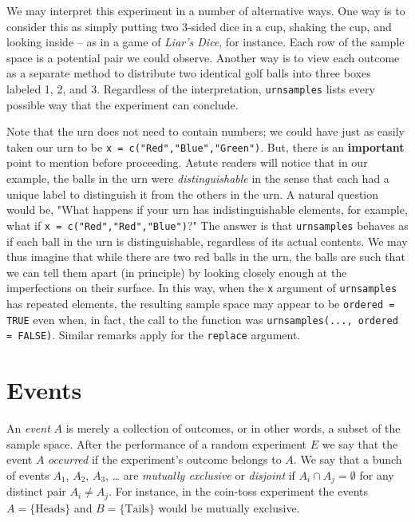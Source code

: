 We may interpret this experiment in a number of alternative ways. One
way is to consider this as simply putting two 3-sided dice in a cup,
shaking the cup, and looking inside -- as in a game of \emph{Liar's Dice},
for instance. Each row of the sample space is a potential pair we
could observe. Another way is to view each outcome as a separate
method to distribute two identical golf balls into three boxes labeled
1, 2, and 3. Regardless of the interpretation, \texttt{urnsamples} lists
every possible way that the experiment can conclude.



Note that the urn does not need to contain numbers; we could have just
as easily taken our urn to be \texttt{x = c("Red","Blue","Green")}. But,
there is an \textbf{important} point to mention before proceeding. Astute
readers will notice that in our example, the balls in the urn were
\emph{distinguishable} in the sense that each had a unique label to
distinguish it from the others in the urn. A natural question would
be, "What happens if your urn has indistinguishable elements, for
example, what if \texttt{x = c("Red","Red","Blue")}?" The answer is that
\texttt{urnsamples} behaves as if each ball in the urn is distinguishable,
regardless of its actual contents. We may thus imagine that while
there are two red balls in the urn, the balls are such that we can
tell them apart (in principle) by looking closely enough at the
imperfections on their surface.
In this way, when the \texttt{x} argument of \texttt{urnsamples} has repeated
elements, the resulting sample space may appear to be \texttt{ordered = TRUE}
even when, in fact, the call to the function was \texttt{urnsamples(...,
ordered = FALSE)}. Similar remarks apply for the \texttt{replace} argument.

\section{Events}
\label{sec-4-2}

An \emph{event}  \(A\) is merely a collection of outcomes, or
in other words, a subset of the sample space. After the
performance of a random experiment \(E\) we say that the event \(A\)
\emph{occurred} if the experiment's outcome belongs to \(A\). We say that a
bunch of events \(A_{1}\), \(A_{2}\), \(A_{3}\), \ldots{} are \emph{mutually
exclusive}  or \emph{disjoint} if \(A_{i}\cap
A_{j}=\emptyset\) for any distinct pair \(A_{i}\neq A_{j}\). For
instance, in the coin-toss experiment the events \( A = \{
\mbox{Heads} \}\) and \( B = \{ \mbox{Tails} \} \) would be mutually
exclusive.

